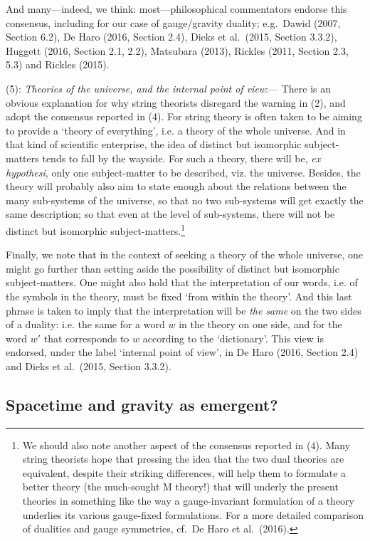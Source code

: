\documentclass[12pt]{article}
\renewcommand{\^}[1]{\hat{#1}}
\begin{document}
And many---indeed, we think: most---philosophical commentators endorse this consensus, including for our case of gauge/gravity duality; e.g.~Dawid (2007, Section 6.2), De Haro (2016, Section 2.4), Dieks et al.~(2015,  Section 3.3.2), Huggett (2016, Section 2.1, 2.2), Matsubara (2013), Rickles (2011, Section 2.3, 5.3) and Rickles (2015). 

(5):  {\em Theories of the universe, and the internal point of view}:--- There is an obvious explanation for why string theorists disregard the warning in (2), and adopt the consensus reported in (4). For string theory is often taken to be aiming to provide a `theory  of everything', i.e. a theory  of the whole universe. And in that kind of scientific enterprise, the idea of distinct but isomorphic subject-matters tends to fall by the wayside. For such a theory, there will be, {\em ex hypothesi}, only one subject-matter to be described, viz. the universe. Besides, the theory will probably also aim to state enough about the relations between the many sub-systems of the universe, so that no two sub-systems will get exactly the same description; so that even at the level of sub-systems, there will not be distinct but isomorphic subject-matters.\footnote{We should also note another aspect of the consensus reported in (4). Many string theorists hope that pressing the idea that the two dual theories are equivalent, despite their striking differences, will help them to formulate a better theory (the much-sought M theory!) that will underly the present theories in something like the way a gauge-invariant formulation of a theory underlies its various gauge-fixed formulations. For a more detailed comparison of dualities and gauge symmetries, cf.~De Haro et al.~(2016).}
 
Finally, we note that in the context of seeking a theory  of the whole universe, one might go further than setting aside the possibility of distinct but isomorphic subject-matters. One might also hold that the interpretation of our words, i.e. of the symbols in the  theory, must be fixed `from within the theory'. And this last phrase is taken to imply that the interpretation  will be {\em the same} on the two sides of a duality: i.e. the same for a word $w$ in the theory on one side, and for the word $w'$ that corresponds to $w$ according to the `dictionary'. This view is endorsed, under the label `internal point of view', in De Haro (2016, Section 2.4) and Dieks et al.~(2015, Section 3.3.2).
   
\subsection{Spacetime and gravity as emergent?}\label{emergence}
\end{document}

